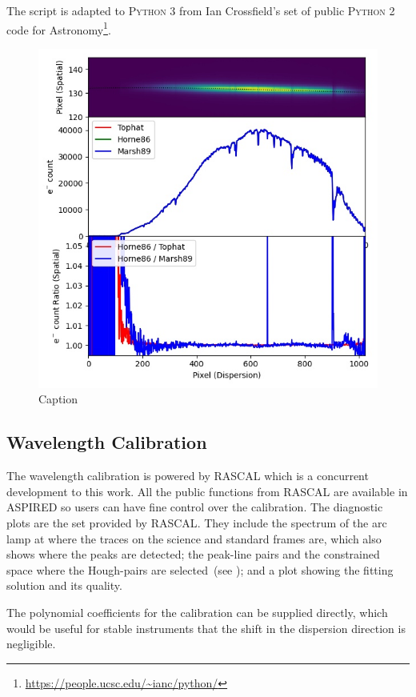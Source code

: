 \documentclass[fleqn,usenatbib]{mnras}
\begin{document}
The script is adapted to \textsc{Python 3} from Ian Crossfield's
set of public \textsc{Python 2} code for 
Astronomy\footnote{\url{https://people.ucsc.edu/~ianc/python/}}.

\begin{figure}
    \centering
    \includegraphics[width=\columnwidth]{fig_04_extraction_compared.jpg}
    \caption{Caption}
    \label{fig:extract}
\end{figure}

\subsection{Wavelength Calibration}
The wavelength calibration is powered by \textsc{RASCAL} which
is a concurrent development to this work. All the public
functions from \textsc{RASCAL} are available in \textsc{ASPIRED}
so users can have fine control over the calibration. The
diagnostic plots are the set provided by \textsc{RASCAL}.
They include the spectrum of the arc lamp at where the traces
on the science and standard frames are, which also shows where
the peaks are detected; the peak-line pairs and the constrained
space where the Hough-pairs are
selected~(see \citealt{2020ASPC..527..627V}); and a plot showing
the fitting solution and its quality.

The polynomial coefficients for the calibration can be supplied
directly, which would be useful for stable instruments that
the shift in the dispersion direction is negligible.
\end{document}

